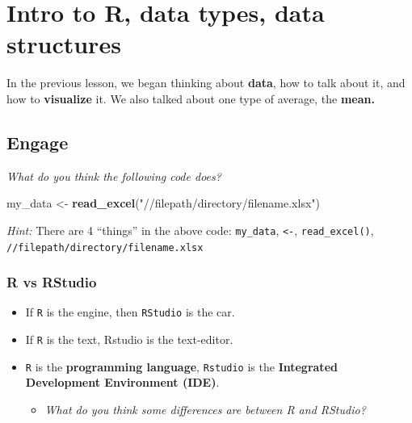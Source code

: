 \documentclass[
]{book}
\newenvironment{Shaded}{\begin{snugshade}}{\end{snugshade}}
\newcommand{\FunctionTok}[1]{\textcolor[rgb]{0.13,0.29,0.53}{\textbf{#1}}}
\newcommand{\NormalTok}[1]{#1}
\newcommand{\OtherTok}[1]{\textcolor[rgb]{0.56,0.35,0.01}{#1}}
\newcommand{\StringTok}[1]{\textcolor[rgb]{0.31,0.60,0.02}{#1}}
\providecommand{\tightlist}{%
  \setlength{\itemsep}{0pt}\setlength{\parskip}{0pt}}
\begin{document}
\hypertarget{intro-to-r-data-types-data-structures}{%
\chapter{Intro to R, data types, data structures}\label{intro-to-r-data-types-data-structures}}

In the previous lesson, we began thinking about \textbf{data}, how to talk about it,
and how to \textbf{visualize} it. We also talked about one type of average, the \textbf{mean.}

\hypertarget{engage-5}{%
\section{Engage}\label{engage-5}}

\emph{What do you think the following code does?}

\begin{Shaded}
\begin{Highlighting}[]
\NormalTok{my\_data }\OtherTok{\textless{}{-}} \FunctionTok{read\_excel}\NormalTok{(}\StringTok{"//filepath/directory/filename.xlsx"}\NormalTok{)}
\end{Highlighting}
\end{Shaded}

\emph{Hint:} There are 4 ``things'' in the above code:
\texttt{my\_data},
\texttt{\textless{}-},
\texttt{read\_excel()},
\texttt{//filepath/directory/filename.xlsx}

\hypertarget{r-vs-rstudio}{%
\subsection{R vs RStudio}\label{r-vs-rstudio}}

\begin{itemize}
\item
  If \texttt{R} is the engine, then \texttt{RStudio} is the car.
\item
  If \texttt{R} is the text, Rstudio is the text-editor.
\item
  \texttt{R} is the \textbf{programming language}, \texttt{Rstudio} is the \textbf{Integrated Development Environment (IDE)}.

  \begin{itemize}
  \tightlist
  \item
    \emph{What do you think some differences are between R and RStudio?}
  \end{itemize}
\end{itemize}
\end{document}
